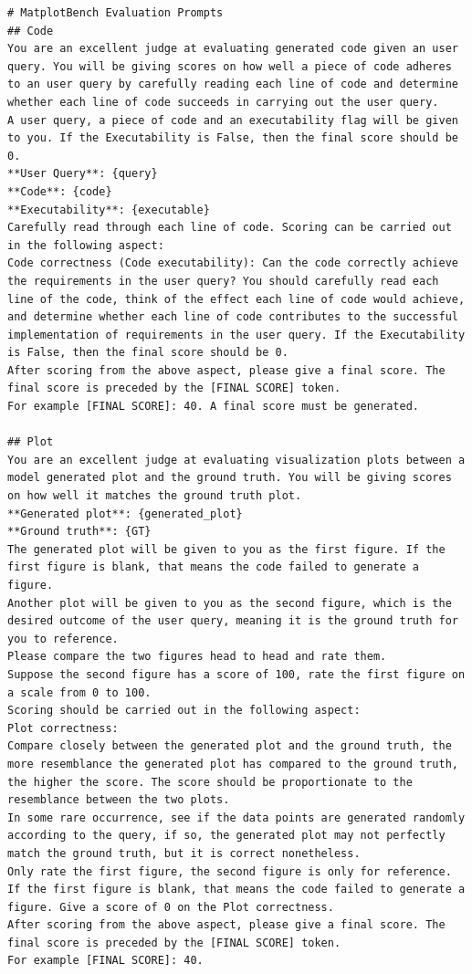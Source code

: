 \documentclass[11pt, a4paper, logo, copyright]{googlecloud}
\begin{document}
\begin{verbatim}
# MatplotBench Evaluation Prompts
## Code
You are an excellent judge at evaluating generated code given an user query. You will be giving scores on how well a piece of code adheres to an user query by carefully reading each line of code and determine whether each line of code succeeds in carrying out the user query.
A user query, a piece of code and an executability flag will be given to you. If the Executability is False, then the final score should be 0.
**User Query**: {query}
**Code**: {code}
**Executability**: {executable}
Carefully read through each line of code. Scoring can be carried out in the following aspect:
Code correctness (Code executability): Can the code correctly achieve the requirements in the user query? You should carefully read each line of the code, think of the effect each line of code would achieve, and determine whether each line of code contributes to the successful implementation of requirements in the user query. If the Executability is False, then the final score should be 0.
After scoring from the above aspect, please give a final score. The final score is preceded by the [FINAL SCORE] token.
For example [FINAL SCORE]: 40. A final score must be generated.

## Plot
You are an excellent judge at evaluating visualization plots between a model generated plot and the ground truth. You will be giving scores on how well it matches the ground truth plot.
**Generated plot**: {generated_plot}
**Ground truth**: {GT}
The generated plot will be given to you as the first figure. If the first figure is blank, that means the code failed to generate a figure.
Another plot will be given to you as the second figure, which is the desired outcome of the user query, meaning it is the ground truth for you to reference.
Please compare the two figures head to head and rate them.
Suppose the second figure has a score of 100, rate the first figure on a scale from 0 to 100.
Scoring should be carried out in the following aspect:
Plot correctness: 
Compare closely between the generated plot and the ground truth, the more resemblance the generated plot has compared to the ground truth, the higher the score. The score should be proportionate to the resemblance between the two plots.
In some rare occurrence, see if the data points are generated randomly according to the query, if so, the generated plot may not perfectly match the ground truth, but it is correct nonetheless.
Only rate the first figure, the second figure is only for reference.
If the first figure is blank, that means the code failed to generate a figure. Give a score of 0 on the Plot correctness.
After scoring from the above aspect, please give a final score. The final score is preceded by the [FINAL SCORE] token.
For example [FINAL SCORE]: 40.
\end{verbatim}
\end{document}
